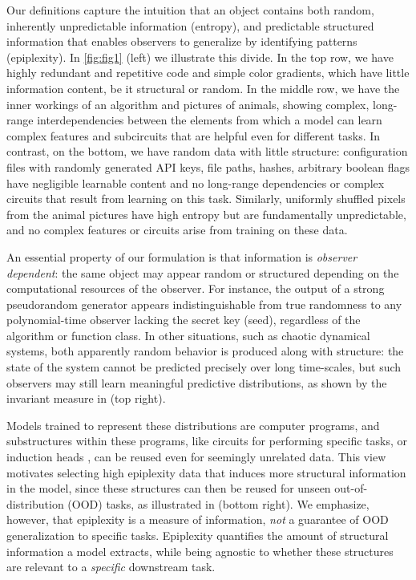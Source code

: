 \documentclass[twoside]{article}
\begin{document}
Our definitions capture the intuition that an object contains both random, inherently unpredictable information (entropy), and predictable structured information that enables observers to generalize by identifying patterns (epiplexity). In \autoref{fig:fig1} (left) we illustrate this divide. In the top row, we have highly redundant and repetitive code and simple color gradients, which have little information content, be it structural or random. In the middle row, we have the inner workings of an algorithm and pictures of animals, showing complex, long-range interdependencies between the elements from which a model can learn complex features and subcircuits that are helpful even for different tasks. In contrast, on the bottom, we have random data with little structure: configuration files with randomly generated API keys, file paths, hashes, arbitrary boolean flags have negligible learnable content and no long-range dependencies or complex circuits that result from learning on this task. Similarly, uniformly shuffled pixels from the animal pictures have high entropy but are fundamentally unpredictable, and no complex features or circuits arise from training on these data. 


An essential property of our formulation is that information is \emph{observer dependent}: the same object may appear random or structured depending on the computational resources of the observer. For instance, the output of a strong pseudorandom generator appears indistinguishable from true randomness to any polynomial-time observer lacking the secret key (seed), regardless of the algorithm or function class. In other situations, such as chaotic dynamical systems, both apparently random behavior is produced along with structure: the state of the system cannot be predicted precisely over long time-scales, but such observers may still learn meaningful predictive distributions, as shown by the invariant measure in  (top right). 



Models trained to represent these distributions are computer programs, and substructures within these programs, like circuits for performing specific tasks, or induction heads \citep{olsson2022context}, can be reused even for seemingly unrelated data. This view motivates selecting high epiplexity data that induces more structural information in the model, since these structures can then be reused for unseen out-of-distribution (OOD) tasks, as illustrated in  (bottom right). We emphasize, however, that epiplexity is a measure of information, \emph{not} a guarantee of OOD generalization to specific tasks. Epiplexity quantifies the amount of structural information a model extracts, while being agnostic to whether these structures are relevant to a \emph{specific} downstream task. 
\end{document}
